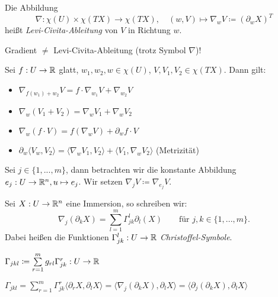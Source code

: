 \documentclass{cheat-sheet}
\begin{document}
\begin{defn}
  Die Abbildung
  \[
    \nabla : \chi(U) \times \chi(TX) \to \chi(TX), \quad
    (w, V) \mapsto \nabla_w V \coloneqq (\partial_w X)^T
  \]
  heißt \emph{Levi-Civita-Ableitung} von $V$ in Richtung $w$.
\end{defn}

\begin{acht}
  Gradient $\not=$ Levi-Civita-Ableitung (trotz Symbol $\nabla$)!
\end{acht}

\begin{satz}
  Sei $f : U \to \mathbb{R}$ glatt, $w_1, w_2, w \in \chi(U)$, $V, V_1, V_2 \in \chi(TX)$. Dann gilt:
  \begin{itemize}
    \item $\nabla_{f(w_1) + w_2} V = f \cdot \nabla_{w_1} V + \nabla_{w_2} V$
    \item $\nabla_w (V_1 + V_2) = \nabla_w V_1 + \nabla_w V_2$
    \item $\nabla_w (f \cdot V) = f (\nabla_w V) + \partial_w f \cdot V $
    \item $\partial_w \langle V_w, V_2 \rangle = \langle \nabla_w V_1 , V_2 \rangle + \langle V_1 , \nabla_w V_2 \rangle$ (Metrizität)
  \end{itemize}
\end{satz}

\begin{nota}
  Sei $j \in \{1, ..., m\}$, dann betrachten wir die konstante Abbildung $e_j : U \to \mathbb{R}^n, u \mapsto e_j$. Wir setzen $\nabla_j V \coloneqq \nabla_{e_j} V$.
\end{nota}

\begin{defn}
  Sei $X : U \to \mathbb{R}^n$ eine Immersion, so schreiben wir:
  \[ \nabla_j (\partial_k X) = \sum_{l=1}^m \Gamma_{jk}^l \partial_l (X)  \qquad \text{für $j,k \in \{ 1, ..., m \}$.} \]
  Dabei heißen die Funktionen $\Gamma_{jk}^l : U \to \mathbb{R}$ \emph{Christoffel-Symbole}.
\end{defn}

\begin{nota}
  $\Gamma_{jkl} \coloneqq \sum_{r=1}^m g_{rl} \Gamma_{jk}^r : U \to \R$
\end{nota}

\begin{satz}
  $\Gamma_{jkl}\!=\!\sum_{r=1}^m \Gamma_{jk}^{r} \langle \partial_r X, \partial_l X \rangle\!=\!\langle \nabla_j (\partial_k X), \partial_l X \rangle\!=\!\langle \partial_j (\partial_k X), \partial_l X \rangle$
\end{satz}
\end{document}
